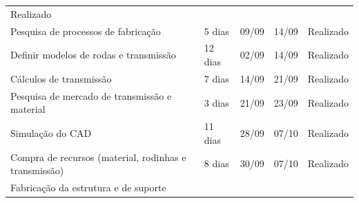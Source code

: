 \begin{table}[H]
{\begin{tabular}{ l l l l l }
    \multicolumn{1}{p{1.833cm}|}{Realizado \centering }
  \\  
  \cline{1-1}\cline{2-2}\cline{3-3}\cline{4-4}\cline{5-5}  
    \multicolumn{1}{|p{3.867cm}|}{Pesquisa de processos de fabricação} &
    \multicolumn{1}{p{1.700cm}|}{5 dias \centering } &
    \multicolumn{1}{p{1.133cm}|}{09/09 \centering } &
    \multicolumn{1}{p{0.967cm}|}{14/09 \centering } &
    \multicolumn{1}{p{1.833cm}|}{Realizado \centering }
  \\  
  \cline{1-1}\cline{2-2}\cline{3-3}\cline{4-4}\cline{5-5}  
    \multicolumn{1}{|p{3.867cm}|}{Definir modelos de rodas e transmissão} &
    \multicolumn{1}{p{1.700cm}|}{12 dias \centering } &
    \multicolumn{1}{p{1.133cm}|}{02/09 \centering } &
    \multicolumn{1}{p{0.967cm}|}{14/09 \centering } &
    \multicolumn{1}{p{1.833cm}|}{Realizado \centering }
  \\  
  \cline{1-1}\cline{2-2}\cline{3-3}\cline{4-4}\cline{5-5}  
    \multicolumn{1}{|p{3.867cm}|}{Cálculos de transmissão} &
    \multicolumn{1}{p{1.700cm}|}{7 dias \centering } &
    \multicolumn{1}{p{1.133cm}|}{14/09 \centering } &
    \multicolumn{1}{p{0.967cm}|}{21/09 \centering } &
    \multicolumn{1}{p{1.833cm}|}{Realizado \centering }
  \\  
  \cline{1-1}\cline{2-2}\cline{3-3}\cline{4-4}\cline{5-5}  
    \multicolumn{1}{|p{3.867cm}|}{Pesquisa de mercado de transmissão e material} &
    \multicolumn{1}{p{1.700cm}|}{3 dias \centering } &
    \multicolumn{1}{p{1.133cm}|}{21/09 \centering } &
    \multicolumn{1}{p{0.967cm}|}{23/09 \centering } &
    \multicolumn{1}{p{1.833cm}|}{Realizado \centering }
  \\  
  \cline{1-1}\cline{2-2}\cline{3-3}\cline{4-4}\cline{5-5}  
    \multicolumn{1}{|p{3.867cm}|}{Simulação do CAD} &
    \multicolumn{1}{p{1.700cm}|}{11 dias \centering } &
    \multicolumn{1}{p{1.133cm}|}{28/09 \centering } &
    \multicolumn{1}{p{0.967cm}|}{07/10 \centering } &
    \multicolumn{1}{p{1.833cm}|}{Realizado \centering }
  \\  
  \cline{1-1}\cline{2-2}\cline{3-3}\cline{4-4}\cline{5-5}  
    \multicolumn{1}{|p{3.867cm}|}{Compra de recursos (material, rodinhas e transmissão)} &
    \multicolumn{1}{p{1.700cm}|}{8 dias \centering } &
    \multicolumn{1}{p{1.133cm}|}{30/09 \centering } &
    \multicolumn{1}{p{0.967cm}|}{07/10 \centering } &
    \multicolumn{1}{p{1.833cm}|}{Realizado \centering }
  \\  
  \cline{1-1}\cline{2-2}\cline{3-3}\cline{4-4}\cline{5-5}  
    \multicolumn{1}{|p{3.867cm}|}{Fabricação da estrutura e de suporte} &

\end{tabular}}
\end{table}
